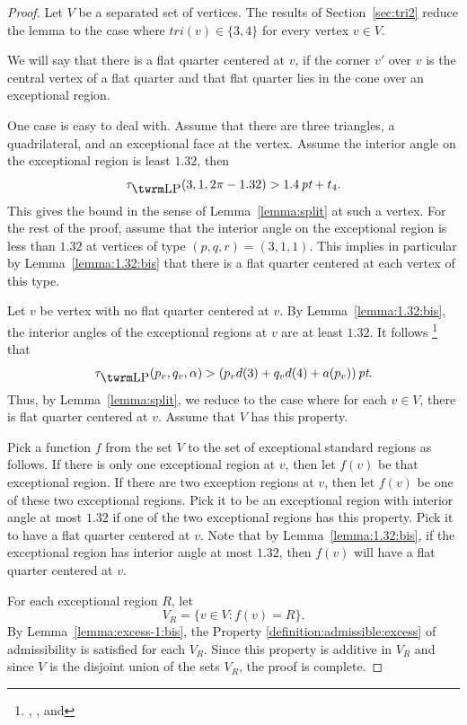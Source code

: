 \begin{proof}  Let $V$ be a separated set of vertices.
The results of Section~\ref{sec:tri2} reduce the lemma to the case
where $tri(v)\in\{3,4\}$ for every vertex $v\in V$.

We will say that there is a flat quarter centered at $v$, if the
corner $v'$ over $v$ is the central vertex of a flat quarter and
that flat quarter lies in the cone over an exceptional region.

One case is easy to deal with.  Assume that there are three
triangles, a quadrilateral, and an exceptional face at the vertex.
Assume the interior angle on the exceptional region is least
$1.32$, then
    \begin{equation}
    \tauLP(3,1,2\pi-1.32)>1.4\,\pt + t_4.
    \label{eqn:tau1.32}
    \end{equation}
This gives the bound in the sense of Lemma~\ref{lemma:split} at
such a vertex. For the rest of the proof, assume that the interior
angle on the exceptional region is less than $1.32$ at vertices of
type $(p,q,r)=(3,1,1)$. This implies in particular by
Lemma~\ref{lemma:1.32:bis} that there is a flat quarter centered
at each vertex of this type.

Let $v$ be vertex with no flat quarter centered at $v$.   By
Lemma~\ref{lemma:1.32:bis}, the interior angles of the
exceptional regions at $v$ are at least $1.32$.   It follows%
\footnote{, , and
}
that
    \begin{equation}
    \tauLP(p_v,q_v,\alpha) > ( p_v d(3) + q_v d(4) + a(p_v))\,\pt.
    \label{eqn:tau-alpha}
    \end{equation}
Thus, by Lemma~\ref{lemma:split}, we reduce to the case where for
each $v\in V$,  there is flat quarter centered at $v$. Assume that
$V$ has this property.

Pick a function $f$ from the set $V$ to the set of exceptional
standard regions as follows. If there is only one exceptional
region at $v$, then let $f(v)$ be that exceptional region. If
there are two exception regions at $v$, then let $f(v)$ be one of
these two exceptional regions.  Pick it to be an exceptional
region with interior angle at most $1.32$ if one of the two
exceptional regions has this property. Pick it to have a flat
quarter centered at $v$. Note that by Lemma~\ref{lemma:1.32:bis},
if the exceptional region has interior angle at most $1.32$, then
$f(v)$ will have a flat quarter centered at $v$.

For each exceptional region $R$, let
    $$V_R = \{ v\in V : f(v) = R\}.$$
By Lemma~\ref{lemma:excess-1:bis}, the Property
\ref{definition:admissible:excess} of admissibility is satisfied
for each $V_R$.  Since this property is additive in $V_R$ and
since $V$ is the disjoint union of the sets $V_R$, the proof is
complete.
\end{proof}


